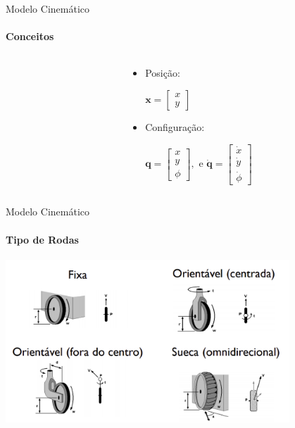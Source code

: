 \documentclass{beamer}
\begin{document}
\begin{frame}{Modelo Cinemático}
    \framesubtitle{Conceitos}
    \begin{columns}
        \begin{column}[c]{0.5\textwidth}
            \centering
            
        \end{column}
        \begin{column}[c]{0.5\textwidth}
            \centering
            \begin{itemize}
                \item Posição:
                \newline
                
                $\mathbf{x} = \begin{bmatrix}
                    x \\
                    y
                \end{bmatrix}$
                \newline

                \item Configuração:
                \newline

                $\mathbf{q} = 
                \begin{bmatrix}
                    x \\
                    y\\
                    \phi
                \end{bmatrix}, \text{ e } 
                \dot{\mathbf{q}} = 
                \begin{bmatrix}
                    \dot{x} \\
                    \dot{y}\\
                    \dot{\phi}
                \end{bmatrix}$            
        \end{itemize}
        \end{column}
    \end{columns}   
\end{frame}



\begin{frame}{Modelo Cinemático}
    \framesubtitle{Tipo de Rodas}
    \begin{center}
        \includegraphics[width=0.8\textwidth]{images/tipo_de_rodas.png}
    \end{center}
\end{frame}
\end{document}
